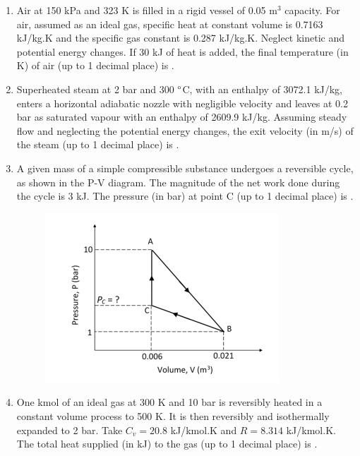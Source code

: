 \documentclass[a4paper,10pt]{article}
\begin{document}
\begin{enumerate}
    \item Air at 150 kPa and 323 K is filled in a rigid vessel of 0.05 m$^3$ capacity. For air, assumed as an ideal gas, specific heat at constant volume is 0.7163 kJ/kg.K and the specific gas constant is 0.287 kJ/kg.K. Neglect kinetic and potential energy changes. If 30 kJ of heat is added, the final temperature (in K) of air (up to 1 decimal place) is \underline{\hspace{2cm}}.
    \hfill{}

    \item Superheated steam at 2 bar and 300 $\degree$C, with an enthalpy of 3072.1 kJ/kg, enters a horizontal adiabatic nozzle with negligible velocity and leaves at 0.2 bar as saturated vapour with an enthalpy of 2609.9 kJ/kg. Assuming steady flow and neglecting the potential energy changes, the exit velocity (in m/s) of the steam (up to 1 decimal place) is \underline{\hspace{2cm}}.
    \hfill{}

    \item A given mass of a simple compressible substance undergoes a reversible cycle, as shown in the P-V diagram. The magnitude of the net work done during the cycle is 3 kJ. The pressure (in bar) at point C (up to 1 decimal place) is \underline{\hspace{2cm}}.
    \begin{figure}[H] \centering \includegraphics[width=0.6\columnwidth]{q20_thermo_2018.png} \caption*{} \label{fig:q20_thermo_2018} \end{figure}
    \hfill{}

    \item One kmol of an ideal gas at 300 K and 10 bar is reversibly heated in a constant volume process to 500 K. It is then reversibly and isothermally expanded to 2 bar. Take $C_v = 20.8$ kJ/kmol.K and $R = 8.314$ kJ/kmol.K. The total heat supplied (in kJ) to the gas (up to 1 decimal place) is \underline{\hspace{2cm}}.
    \hfill{}


\end{enumerate}
\end{document}
